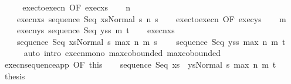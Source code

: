 \begin{isabellebody}
\ {\isacharminus}\isanewline
\ \ \isamarkupfalse%
\ exec{\isacharunderscore}to{\isacharunderscore}execn\ {\isacharbrackleft}OF\ exec{\isacharunderscore}xs{\isacharbrackright}\isanewline
\ \ \isamarkupfalse%
\ n\ \ \isanewline
\ \ \ \ execn{\isacharunderscore}xs{\isacharcolon}\ {\isachardoublequoteopen}{\isasymGamma}{\isasymturnstile}{\isasymlangle}sequence\ Seq\ xs{\isacharcomma}Normal\ s{\isasymrangle}\ {\isacharequal}n{\isasymRightarrow}\ s{\isacharprime}{\isachardoublequoteclose}\isacommand{{\isachardot}{\isachardot}}\isamarkupfalse%
\isanewline
\ \ \isamarkupfalse%
\ exec{\isacharunderscore}to{\isacharunderscore}execn\ {\isacharbrackleft}OF\ exec{\isacharunderscore}ys{\isacharbrackright}\isanewline
\ \ \isamarkupfalse%
\ m\ \isanewline
\ \ \ \ execn{\isacharunderscore}ys{\isacharcolon}\ {\isachardoublequoteopen}{\isasymGamma}{\isasymturnstile}{\isasymlangle}sequence\ Seq\ ys{\isacharcomma}s{\isacharprime}{\isasymrangle}\ {\isacharequal}m{\isasymRightarrow}\ t{\isachardoublequoteclose}\isacommand{{\isachardot}{\isachardot}}\isamarkupfalse%
\isanewline
\ \ \isamarkupfalse%
\ execn{\isacharunderscore}xs\ \isamarkupfalse%
\isanewline
\ \ \ \ {\isachardoublequoteopen}{\isasymGamma}{\isasymturnstile}{\isasymlangle}sequence\ Seq\ xs{\isacharcomma}Normal\ s{\isasymrangle}\ {\isacharequal}max\ n\ m{\isasymRightarrow}\ s{\isacharprime}{\isachardoublequoteclose}\isanewline
\ \ \ \ {\isachardoublequoteopen}{\isasymGamma}{\isasymturnstile}{\isasymlangle}sequence\ Seq\ ys{\isacharcomma}s{\isacharprime}{\isasymrangle}\ {\isacharequal}max\ n\ m{\isasymRightarrow}\ t{\isachardoublequoteclose}\isanewline
\ \ \ \ \isamarkupfalse%
\ {\isacharparenleft}auto\ intro{\isacharcolon}\ execn{\isacharunderscore}mono\ max{\isachardot}cobounded{}\ max{\isachardot}cobounded{}{\isacharparenright}\isanewline
\ \ \isamarkupfalse%
\ execn{\isacharunderscore}sequence{\isacharunderscore}app\ {\isacharbrackleft}OF\ this{\isacharbrackright}\isanewline
\ \ \isamarkupfalse%
\ {\isachardoublequoteopen}{\isasymGamma}{\isasymturnstile}{\isasymlangle}sequence\ Seq\ {\isacharparenleft}xs\ {\isacharat}\ ys{\isacharparenright}{\isacharcomma}Normal\ s{\isasymrangle}\ {\isacharequal}max\ n\ m{\isasymRightarrow}\ t{\isachardoublequoteclose}\ \isacommand{{\isachardot}}\isamarkupfalse%
\isanewline
\ \ \isamarkupfalse%
\ {\isacharquery}thesis\isanewline
\ \ \ \ \isamarkupfalse%

\end{isabellebody}
